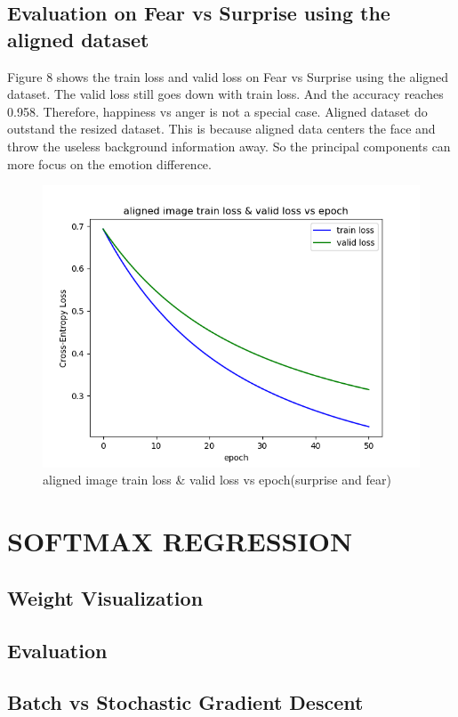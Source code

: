 \documentclass{article} %
\begin{document}
\subsection {Evaluation on Fear vs Surprise using the aligned dataset}
Figure 8 shows the train loss and valid loss on Fear vs Surprise using the aligned dataset. The valid loss still goes down with train loss. And the accuracy reaches 0.958. Therefore, happiness vs anger is not a special case. Aligned dataset do outstand the resized dataset. This is because aligned data centers the face and throw the useless background information away. So the principal components can more focus on the emotion difference.
\begin{figure}[h]
	\centering
	\includegraphics[scale=0.5]{./graph/aligned_angerfear.png}
	\caption{aligned image train loss \& valid loss vs epoch(surprise and fear)}
\end{figure}

\section{SOFTMAX REGRESSION}

\subsection {Weight Visualization}
\subsection {Evaluation}
\subsection {Batch vs Stochastic Gradient Descent}
\end{document}
